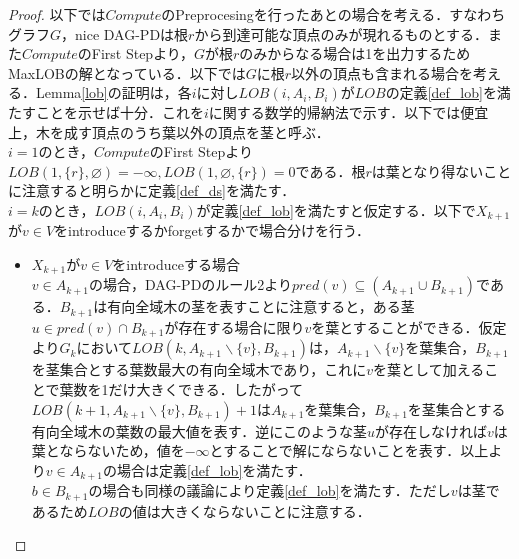 \documentclass[master]{kuisthesis}		%
\theoremstyle{plain}
\theoremstyle{definition}
\begin{document}
\begin{proof}
    以下では$Compute$のPreprocesingを行ったあとの場合を考える．すなわちグラフ$G$，nice DAG-PDは根$r$から到達可能な頂点のみが現れるものとする．また$Compute$のFirst Stepより，$G$が根$r$のみからなる場合は1を出力するためMaxLOBの解となっている．以下では$G$に根$r$以外の頂点も含まれる場合を考える．Lemma\ref{lob}の証明は，各$i$に対し$LOB(i, A_i, B_i)$が$LOB$の定義\ref{def_lob}を満たすことを示せば十分．これを$i$に関する数学的帰納法で示す．以下では便宜上，木を成す頂点のうち葉以外の頂点を茎と呼ぶ．\\
    $i=1$のとき，$Compute$のFirst Stepより$LOB(1, \{r\}, \varnothing) = -\infty, LOB(1, \varnothing, \{r\}) = 0$である．根$r$は葉となり得ないことに注意すると明らかに定義\ref{def_ds}を満たす．\\
    $i=k$のとき，$LOB(i, A_i, B_i)$が定義\ref{def_lob}を満たすと仮定する．以下で$X_{k+1}$が$v \in V$をintroduceするかforgetするかで場合分けを行う．
    \begin{itemize}
        \item $X_{k+1}$が$v \in V$をintroduceする場合 \\
        $v \in A_{k+1}$の場合，DAG-PDのルール2より$pred(v) \subseteq (A_{k+1} \cup B_{k+1})$である．$B_{k+1}$は有向全域木の茎を表すことに注意すると，ある茎$u \in pred(v) \cap B_{k+1}$が存在する場合に限り$v$を葉とすることができる．仮定より$G_k$において$LOB(k, A_{k+1} \backslash \{v\}, B_{k+1})$は，$A_{k+1} \backslash \{v\}$を葉集合，$B_{k+1}$を茎集合とする葉数最大の有向全域木であり，これに$v$を葉として加えることで葉数を1だけ大きくできる．したがって$LOB(k+1, A_{k+1} \backslash \{v\}, B_{k+1})+1$は$A_{k+1}$を葉集合，$B_{k+1}$を茎集合とする有向全域木の葉数の最大値を表す．逆にこのような茎$u$が存在しなければ$v$は葉とならないため，値を$-\infty$とすることで解にならないことを表す．以上より$v \in A_{k+1}$の場合は定義\ref{def_lob}を満たす．\\
        $b \in B_{k+1}$の場合も同様の議論により定義\ref{def_lob}を満たす．ただし$v$は茎であるため$LOB$の値は大きくならないことに注意する．


\end{itemize}
\end{proof}
\end{document}
